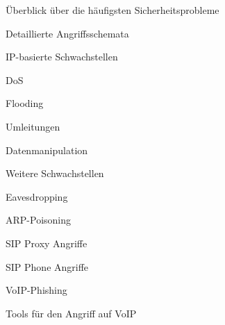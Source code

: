 \label{Angriffe auf VoIP}

 \label{Überblick über die häufigsten Sicherheitsprobleme}
 \begin{section}{Überblick über die häufigsten Sicherheitsprobleme}
 \end{section}
 
 \label{Detaillierte Angriffsschemata}
 \begin{section}{Detaillierte Angriffsschemata}
 \end{section}
 
 \label{IP-basierte Schwachstellen}
 \begin{subsection}{IP-basierte Schwachstellen}

  \begin{subsubsection}{DoS}
  \end{subsubsection}
  \begin{subsubsection}{Flooding}
  \end{subsubsection}
  \begin{subsubsection}{Umleitungen}
  \end{subsubsection}
  \begin{subsubsection}{Datenmanipulation}
  \end{subsubsection}  
  
 \end{subsection}
 
 \label{Weitere Schwachstellen}
 \begin{subsection}{Weitere Schwachstellen}
   
  \begin{subsubsection}{Eavesdropping}
  \end{subsubsection}
  \begin{subsubsection}{ARP-Poisoning}
  \end{subsubsection}
  \begin{subsubsection}{SIP Proxy Angriffe}
  \end{subsubsection}
  \begin{subsubsection}{SIP Phone Angriffe}
  \end{subsubsection}
  \begin{subsubsection}{VoIP-Phishing}
  \end{subsubsection}
  
 \end{subsection}
 
 \label{Tools für den Angriff auf VoIP}
 \begin{section}{Tools für den Angriff auf VoIP}
 \end{section}
 
